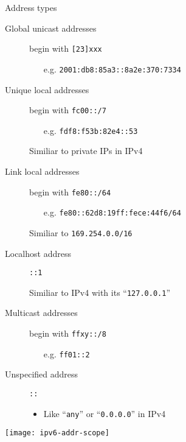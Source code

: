\begin{frame}{Address types}
  \begin{minipage}{.7\linewidth}
  \begin{description}
  \item[Global unicast addresses] begin with \texttt{[23]xxx}
    \begin{itemize}
    \item[e.g.] \texttt{2001:db8:85a3::8a2e:370:7334}
    \end{itemize}
  \item[Unique local addresses] begin with \texttt{fc00::/7}
    \begin{itemize}
    \item[e.g.] \texttt{fdf8:f53b:82e4::53}
    \end{itemize}
    Similiar to private IPs in IPv4
  \item[Link local addresses] begin with \texttt{fe80::/64}
    \begin{itemize}
    \item[e.g.] \texttt{fe80::62d8:19ff:fece:44f6/64}
    \end{itemize}
    Similiar to \texttt{169.254.0.0/16}
  \item[Localhost address] \texttt{::1}\par
    Similiar to IPv4 with its ``\texttt{127.0.0.1}''
  \item[Multicast addresses] begin with \texttt{ffxy::/8}
    \begin{itemize}
    \item[e.g.] \texttt{ff01::2}
    \end{itemize}
  \item[Unspecified address] \texttt{::}
    \begin{itemize}
    \item Like ``\texttt{any}'' or ``\texttt{0.0.0.0}'' in IPv4
    \end{itemize}
  \end{description}
  \end{minipage}\hfill
  \begin{minipage}{.3\linewidth}
    \texttt{[image: ipv6-addr-scope]}
  \end{minipage}
\end{frame}

      
